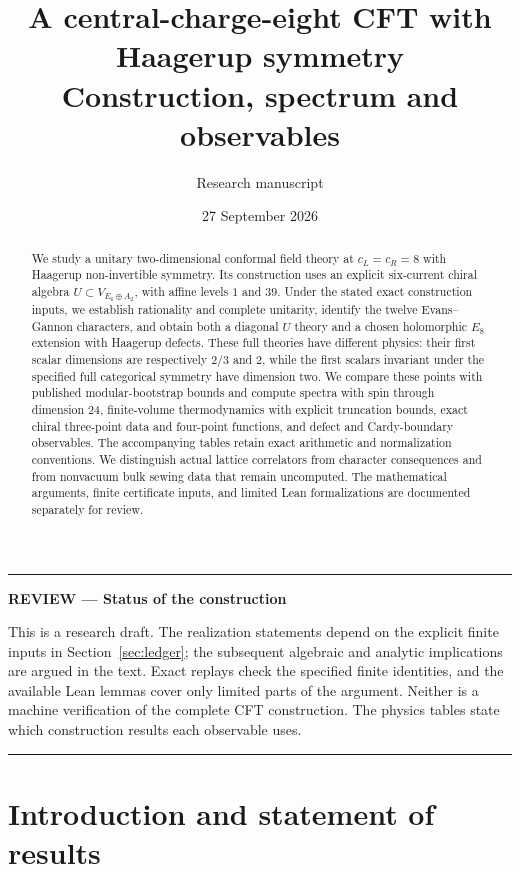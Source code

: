 \documentclass[11pt,a4paper]{article}
\title{A central-charge-eight CFT with\\[3pt]
  Haagerup symmetry\\[5pt]
  \large Construction, spectrum and observables}
\author{Research manuscript}
\date{27 September 2026}
\theoremstyle{definition}
\newenvironment{reviewnote}[1]{\par\addvspace{8pt}\begingroup
  \color{Sepia}\noindent\rule{\linewidth}{0.7pt}\par\nobreak
  \noindent\textbf{REVIEW --- #1}\par\nobreak\small\noindent\ignorespaces
}{\par\noindent\rule{\linewidth}{0.7pt}\par\endgroup\addvspace{8pt}}
\begin{document}
\maketitle
\begin{abstract}
We study a unitary two-dimensional conformal field theory at
$c_L=c_R=8$ with Haagerup non-invertible symmetry. Its construction uses
an explicit six-current chiral algebra $U\subset V_{E_6\oplus A_2}$,
with affine levels $1$ and $39$. Under the stated exact construction
inputs, we establish rationality and complete unitarity, identify the
twelve Evans--Gannon characters, and obtain both a diagonal $U$ theory
and a chosen holomorphic $E_8$ extension with Haagerup defects.
These full theories have different physics: their first scalar
dimensions are respectively $2/3$ and $2$, while the first scalars
invariant under the specified full categorical symmetry have dimension
two. We compare these points with published modular-bootstrap bounds
and compute spectra with spin through dimension $24$, finite-volume
thermodynamics with explicit truncation bounds, exact chiral three-point
data and four-point functions, and defect and Cardy-boundary observables.
The accompanying tables retain exact arithmetic and normalization
conventions. We distinguish actual lattice correlators from character
consequences and from nonvacuum bulk sewing data that remain uncomputed.
The mathematical arguments, finite certificate inputs, and limited
Lean formalizations are documented separately for review.
\end{abstract}

\begin{reviewnote}{Status of the construction}
This is a research draft. The realization statements depend on the
explicit finite inputs in Section~\ref{sec:ledger}; the subsequent
algebraic and analytic implications are argued in the text. Exact
replays check the specified finite identities, and the available Lean
lemmas cover only limited parts of the argument. Neither is a machine
verification of the complete CFT construction. The physics tables state
which construction results each observable uses.
\end{reviewnote}

\clearpage
\tableofcontents
\clearpage

\section{Introduction and statement of results}
\label{sec:statement}
\end{document}
